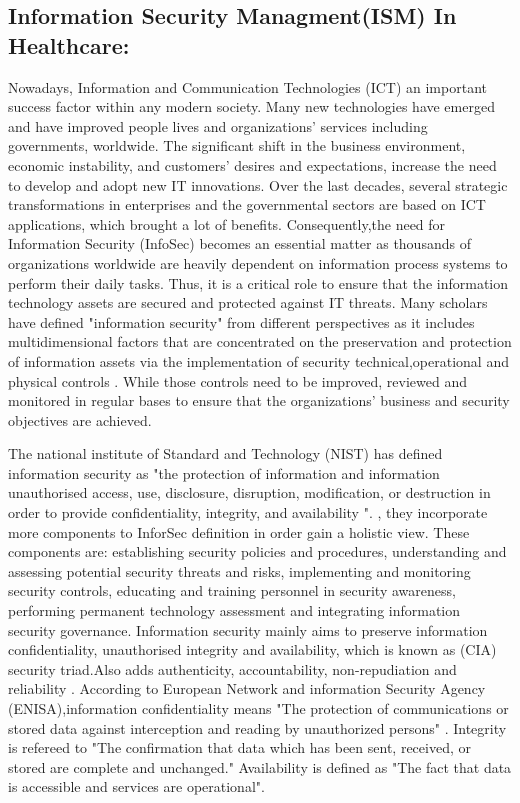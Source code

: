 
\subsection{Information Security Managment(ISM) In Healthcare:}
Nowadays, Information and Communication Technologies (ICT) an important success factor within any modern society. Many new technologies have emerged and have improved people lives and organizations’ services including governments, worldwide. The significant shift in the business environment, economic instability, and customers’ desires and expectations, increase the need to develop and adopt new IT innovations. Over the last decades, several strategic transformations in enterprises and the governmental sectors are based on ICT applications, which brought a lot of benefits. Consequently,the need for Information Security (InfoSec) becomes an essential matter as thousands of organizations worldwide are heavily dependent on information process systems to perform their daily tasks. Thus, it is a critical role to ensure that the information technology assets are secured and protected against IT threats.
Many scholars have defined "information security" from different perspectives as it includes multidimensional factors that are concentrated on the preservation and protection of information assets via the implementation of security technical,operational and physical controls \cite{Hamid2014,Posthumus2004}. While those controls  need to be improved, reviewed and monitored in regular bases to ensure that the organizations' business and security objectives are achieved\cite{ISO/IEC2014}.


The national institute of Standard and Technology (NIST)\cite{Kissel2013} has defined information security as "the protection of information and information unauthorised access, use, disclosure, disruption, modification, or destruction in order to provide confidentiality, integrity, and availability ". \citet{Zafar2009}, they incorporate more components to InforSec definition in order gain a holistic view. These components are: establishing security policies and procedures, understanding and assessing potential security threats and risks, implementing and monitoring security controls, educating and training personnel in security awareness, performing permanent technology assessment and integrating information security governance. Information security mainly aims to preserve information confidentiality, unauthorised integrity and availability, which is known as (CIA) security triad\cite{pfleeger2007security}.Also \cite{ISO/IEC2014} adds authenticity, accountability, non-repudiation and reliability . According to European Network and information Security Agency (ENISA)\cite{ENISA2006},information confidentiality means "The protection of communications or stored data against interception and reading by unauthorized persons" . Integrity is refereed to "The confirmation that data which has been sent, received, or stored are complete and unchanged." Availability is defined as "The fact that data is accessible and services are operational". 


